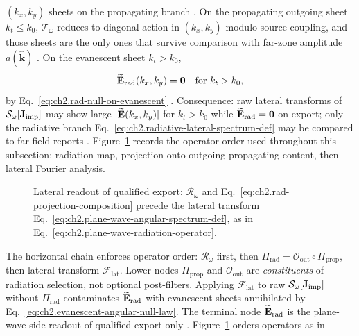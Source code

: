 \((k_x,k_y)\) sheets on the propagating branch \cite{hansen1988}. On the propagating outgoing sheet
\(k_t\le k_0\), \(\mathcal{T}_\omega\) reduces to diagonal action in \((k_x,k_y)\) modulo
source coupling, and those sheets are the only ones that survive comparison with far-zone
amplitude \(a(\widehat{\mathbf{k}})\) \cite{stratton1941}. On the evanescent sheet \(k_t>k_0\),
\begin{equation}
\label{eq:ch2.evanescent-angular-null-law}
\widetilde{\mathbf{E}}_{\mathrm{rad}}(k_x,k_y)=\mathbf{0}
\quad\text{for}\ k_t>k_0,
\end{equation}
by Eq.~\eqref{eq:ch2.rad-null-on-evanescent} \cite{stratton1941}. Consequence: raw lateral
transforms of \(\mathcal{S}_\omega[\mathbf{J}_{\mathrm{imp}}]\) may show large \(|\widetilde{\mathbf{E}}(k_x,k_y)|\) for
\(k_t>k_0\) while \(\widetilde{\mathbf{E}}_{\mathrm{rad}}=\mathbf{0}\) on export; only the radiative
branch Eq.~\eqref{eq:ch2.radiative-lateral-spectrum-def} may be compared to far-field reports
\cite{harrington2001}. Figure~\ref{fig:ch2.plane-wave-radiation-measurement chain} records the
operator order used throughout this subsection: radiation map, projection onto outgoing
propagating content, then lateral Fourier analysis.
\begin{figure}[t]
\centering
{}
\caption{Lateral readout of qualified export: \(\mathcal{R}_\omega\) and
Eq.~\eqref{eq:ch2.rad-projection-composition} precede the lateral transform
Eq.~\eqref{eq:ch2.plane-wave-angular-spectrum-def}, as in
Eq.~\eqref{eq:ch2.plane-wave-radiation-operator}.}
\label{fig:ch2.plane-wave-radiation-measurement chain}
\end{figure}
The horizontal chain enforces operator order: $\mathcal{R}_\omega$ first, then $\Pi_{\mathrm{rad}}=\mathcal{O}_{\mathrm{out}}\circ\Pi_{\mathrm{prop}}$, then lateral transform $\mathcal{F}_{\mathrm{lat}}$. Lower nodes $\Pi_{\mathrm{prop}}$ and $\mathcal{O}_{\mathrm{out}}$ are \emph{constituents} of radiation selection, not optional post-filters. Applying $\mathcal{F}_{\mathrm{lat}}$ to raw $\mathcal{S}_\omega[\mathbf{J}_{\mathrm{imp}}]$ without $\Pi_{\mathrm{rad}}$ contaminates $\widetilde{\mathbf{E}}_{\mathrm{rad}}$ with evanescent sheets annihilated by Eq.~\eqref{eq:ch2.evanescent-angular-null-law}. The terminal node $\widetilde{\mathbf{E}}_{\mathrm{rad}}$ is the plane-wave-side readout of qualified export only \cite{stratton1941}. Figure~\ref{fig:ch2.plane-wave-radiation-measurement chain} orders operators as in
